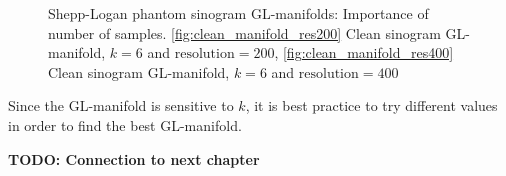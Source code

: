 \begin{figure}[H]
    \centering
    \hfill
    \hfill
    \hfill
    \caption{Shepp-Logan phantom sinogram GL-manifolds: Importance of number of samples.
    \ref{fig:clean_manifold_res200} Clean sinogram GL-manifold, $k = 6$ and $\text{resolution}=200$,
    \ref{fig:clean_manifold_res400} Clean sinogram GL-manifold, $k = 6$ and $\text{resolution}=400$}
\end{figure}


\begin{tcolorbox}[colback=red!5!white,colframe=red!75!black]
    Since the GL-manifold is sensitive to $k$, it is best practice to try different values in order to find the best GL-manifold.
\end{tcolorbox}



\textbf{TODO: Connection to next chapter}